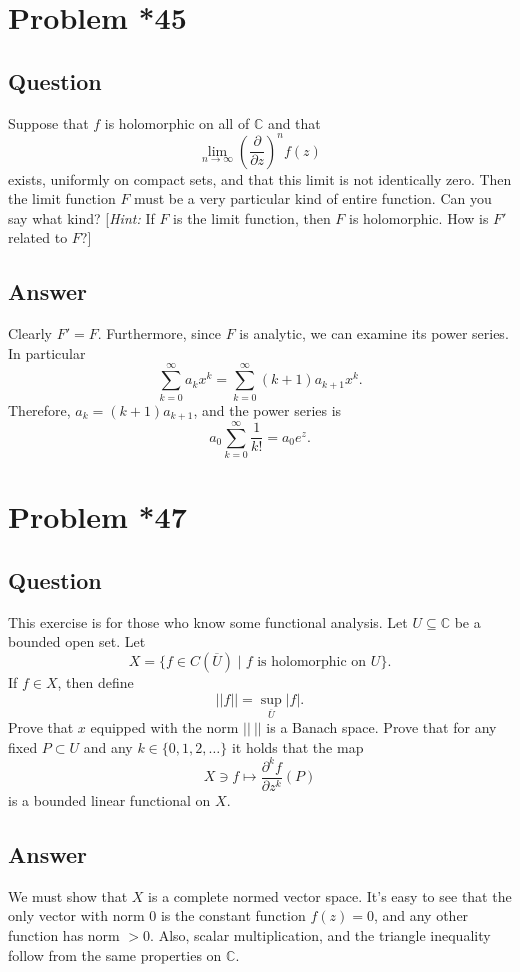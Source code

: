 \documentclass[11pt]{article}
\begin{document}
\section{Problem  *45}
\subsection{Question}
Suppose that $f$ is holomorphic on all of $\mathbb{C}$ and that
\[\lim_{n \to \infty} \left( \frac{\partial}{\partial z} \right) ^n f(z)\]
exists, uniformly on compact sets, and that this limit is not identically zero. Then the limit function $F$ must be a very particular kind of entire function. Can you say what kind? [\emph{Hint:} If $F$ is the limit function, then $F$ is holomorphic. How is $F'$ related to $F$?]
\subsection{Answer}
Clearly $F' = F$. Furthermore, since $F$ is analytic, we can examine its power series. In particular
\[\sum_{k=0}^\infty a_k x^k = \sum_{k=0}^\infty (k+1) a_{k+1} x^k.\]
Therefore, $a_k = (k+1)a_{k+1}$, and the power series is
\[a_0 \sum_{k=0}^\infty \frac{1}{k!} = a_0 e^z.\]

\section{Problem *47}
\subsection{Question}
This exercise is for those who know some functional analysis. Let $U \subseteq \mathbb{C}$ be a bounded open set. Let 
\[X = \{ f \in C(\overline{U} ) \mid f \mbox{ is holomorphic on }U\}.\]
If $f \in X$, then define 
\[||f|| = \sup_{\overline{U}}|f|.\]
Prove that $x$ equipped with the norm $||\ ||$ is a Banach space.  Prove that for any fixed $P \subset U$ and any $k \in \{0,1,2,\dots\}$ it holds that the map 
\[X \ni f \mapsto \frac{\partial^k f}{\partial z^k}(P)\]
is a bounded linear functional on $X$.
\subsection{Answer}
We must show that $X$ is a complete normed vector space. It's easy to see that the only vector with norm 0 is the constant function $f(z)=0$, and any other function has norm $> 0$. Also, scalar multiplication, and the triangle inequality follow from the same properties on $\mathbb{C}$.
\end{document}
